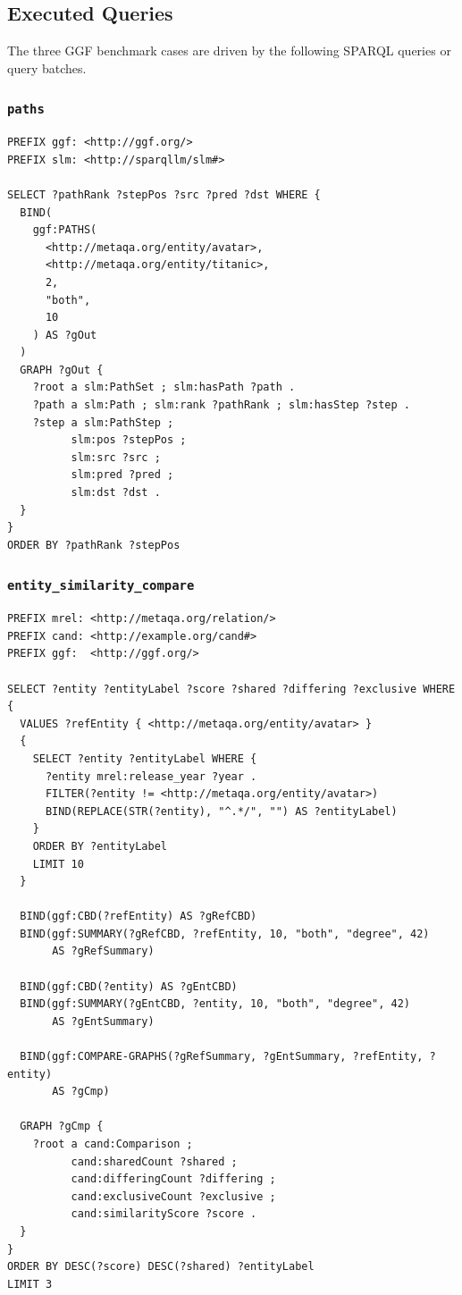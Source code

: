 \subsection{Executed Queries}
\label{subsec:executed-queries}

The three GGF benchmark cases are driven by the following SPARQL queries or
query batches.

\subsubsection*{\texttt{paths}}

\begin{verbatim}
PREFIX ggf: <http://ggf.org/>
PREFIX slm: <http://sparqllm/slm#>

SELECT ?pathRank ?stepPos ?src ?pred ?dst WHERE {
  BIND(
    ggf:PATHS(
      <http://metaqa.org/entity/avatar>,
      <http://metaqa.org/entity/titanic>,
      2,
      "both",
      10
    ) AS ?gOut
  )
  GRAPH ?gOut {
    ?root a slm:PathSet ; slm:hasPath ?path .
    ?path a slm:Path ; slm:rank ?pathRank ; slm:hasStep ?step .
    ?step a slm:PathStep ;
          slm:pos ?stepPos ;
          slm:src ?src ;
          slm:pred ?pred ;
          slm:dst ?dst .
  }
}
ORDER BY ?pathRank ?stepPos
\end{verbatim}

\subsubsection*{\texttt{entity\_similarity\_compare}}

\begin{verbatim}
PREFIX mrel: <http://metaqa.org/relation/>
PREFIX cand: <http://example.org/cand#>
PREFIX ggf:  <http://ggf.org/>

SELECT ?entity ?entityLabel ?score ?shared ?differing ?exclusive WHERE {
  VALUES ?refEntity { <http://metaqa.org/entity/avatar> }
  {
    SELECT ?entity ?entityLabel WHERE {
      ?entity mrel:release_year ?year .
      FILTER(?entity != <http://metaqa.org/entity/avatar>)
      BIND(REPLACE(STR(?entity), "^.*/", "") AS ?entityLabel)
    }
    ORDER BY ?entityLabel
    LIMIT 10
  }

  BIND(ggf:CBD(?refEntity) AS ?gRefCBD)
  BIND(ggf:SUMMARY(?gRefCBD, ?refEntity, 10, "both", "degree", 42)
       AS ?gRefSummary)

  BIND(ggf:CBD(?entity) AS ?gEntCBD)
  BIND(ggf:SUMMARY(?gEntCBD, ?entity, 10, "both", "degree", 42)
       AS ?gEntSummary)

  BIND(ggf:COMPARE-GRAPHS(?gRefSummary, ?gEntSummary, ?refEntity, ?entity)
       AS ?gCmp)

  GRAPH ?gCmp {
    ?root a cand:Comparison ;
          cand:sharedCount ?shared ;
          cand:differingCount ?differing ;
          cand:exclusiveCount ?exclusive ;
          cand:similarityScore ?score .
  }
}
ORDER BY DESC(?score) DESC(?shared) ?entityLabel
LIMIT 3
\end{verbatim}

